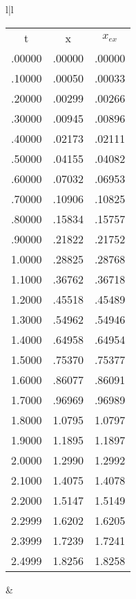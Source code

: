 \begin{figure}
    \centering
    \begin{tabular}{l|l}
        \begin{tabular}{ccc}
            \multicolumn{1}{c}{t} & 
            \multicolumn{1}{c}{x} & 
            \multicolumn{1}{c}{$x_{ex}$}\\
            .00000 & .00000 & .00000 \\
            .10000 & .00050 & .00033 \\
            .20000 & .00299 & .00266 \\
            .30000 & .00945 & .00896 \\
            .40000 & .02173 & .02111 \\
            .50000 & .04155 & .04082 \\
            .60000 & .07032 & .06953 \\
            .70000 & .10906 & .10825 \\
            .80000 & .15834 & .15757 \\
            .90000 & .21822 & .21752 \\
            1.0000 & .28825 & .28768 \\
            1.1000 & .36762 & .36718 \\
            1.2000 & .45518 & .45489 \\
            1.3000 & .54962 & .54946 \\
            1.4000 & .64958 & .64954 \\
            1.5000 & .75370 & .75377 \\
            1.6000 & .86077 & .86091 \\
            1.7000 & .96969 & .96989 \\
            1.8000 & 1.0795 & 1.0797 \\
            1.9000 & 1.1895 & 1.1897 \\
            2.0000 & 1.2990 & 1.2992 \\
            2.1000 & 1.4075 & 1.4078 \\
            2.2000 & 1.5147 & 1.5149 \\
            2.2999 & 1.6202 & 1.6205 \\
            2.3999 & 1.7239 & 1.7241 \\
            2.4999 & 1.8256 & 1.8258 \\
        \end{tabular}
        &
        \begin{tabular}{ccc}

\end{tabular}
\end{tabular}
\end{figure}
